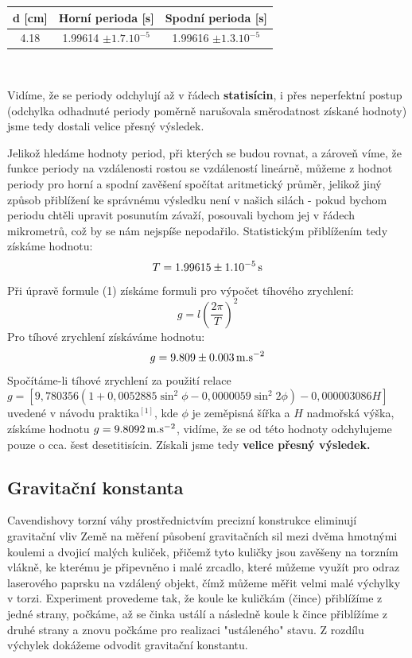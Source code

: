 \documentclass[czech,11pt,a4paper]{article}
\begin{document}
	\begin{center}
		\begin{tabular}{c|c|c}
			d [cm] & Horní perioda [s] & Spodní perioda [s] \\ \hline
			4.18      & 1.99614 $\pm 1.7.10^{-5}$  & 1.99616 $\pm 1.3.10^{-5}$    \\ 
		\end{tabular}\\
	\end{center}
		
		Vidíme, že se periody odchylují až v řádech \textbf{statisícin}, i přes neperfektní postup (odchylka odhadnuté periody poměrně narušovala směrodatnost získané hodnoty) jsme tedy dostali velice přesný výsledek.
		
		Jelikož hledáme hodnoty period, při kterých se budou rovnat, a zároveň víme, že funkce periody na vzdálenosti rostou se vzdáleností lineárně, můžeme z hodnot periody pro horní a spodní zavěšení spočítat aritmetický průměr, jelikož jiný způsob přiblížení ke správnému výsledku není v našich silách - pokud bychom periodu chtěli upravit posunutím závaží, posouvali bychom jej v řádech mikrometrů, což by se nám nejspíše nepodařilo.
		Statistickým přiblížením tedy získáme hodnotu:
		\begin{equation}
			T = 1.99615 \pm 1.10^{-5}\,\rm s
		\end{equation}
		Při úpravě formule (1) získáme formuli pro výpočet tíhového zrychlení:
		\begin{equation}
			g = l \left(\frac{2\pi }{T}\right)^2
		\end{equation}
		Pro tíhové zrychlení získáváme hodnotu:
		\begin{equation}
			g = 9.809 \pm 0.003 \,\rm m.s^{-2}
		\end{equation}
		Spočítáme-li tíhové zrychlení za použití relace \\ $ g = [9,780 356(1 + 0,005 288 5 \sin^2 \phi - 0,000 005 9 \sin^2
		2 \phi) - 0,000 003 086 H ]$ uvedené v návodu praktika$^{[1]}$, kde $\phi $ je zeměpisná šířka a $H$ nadmořská výška, získáme hodnotu  $g = 9.8092 \,\rm m.s^{-2}$, vidíme, že se od této hodnoty odchylujeme pouze o cca. šest desetitisícin. Získali jsme tedy \textbf{velice přesný výsledek.}
		\subsection{Gravitační konstanta}
		Cavendishovy torzní váhy prostřednictvím precizní konstrukce eliminují gravitační vliv Země na měření působení gravitačních sil mezi dvěma hmotnými koulemi a dvojicí malých kuliček, přičemž tyto kuličky jsou zavěšeny na torzním vlákně, ke kterému je připevněno i malé zrcadlo, které můžeme využít pro odraz laserového paprsku na vzdálený objekt, čímž můžeme měřit velmi malé výchylky v torzi. 
		Experiment provedeme tak, že koule ke kuličkám (čince) přiblížíme z jedné strany, počkáme, až se činka ustálí a následně koule k čince přiblížíme z druhé strany a znovu počkáme pro realizaci "ustáleného" stavu. Z rozdílu výchylek dokážeme odvodit gravitační konstantu.
		
\end{document}

